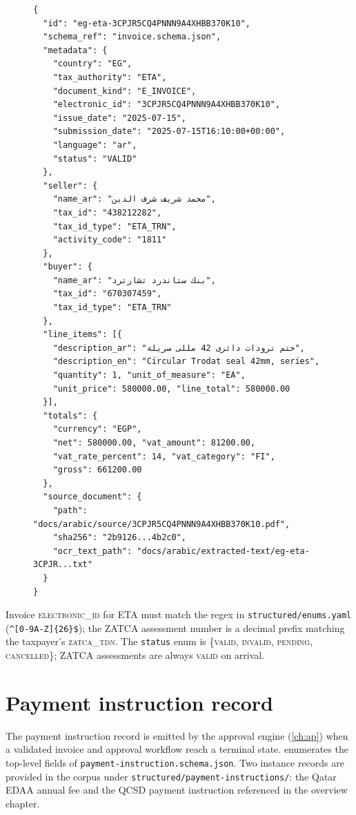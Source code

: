 \documentclass[11pt,a4paper,twoside]{report}
\newcommand{\corpus}{}
\begin{document}
\begin{figure}[htbp]
\begin{lstlisting}[language=jsonx,caption={Full invoice record for the
Egypt ETA seal invoice (\texttt{eg-eta-3CPJR5CQ4PNNN9A4XHBB370K10}).
Arabic strings are UTF-8; the LaTeX engine renders them RTL.},
label=lst:invoice-example]
{
  "id": "eg-eta-3CPJR5CQ4PNNN9A4XHBB370K10",
  "schema_ref": "invoice.schema.json",
  "metadata": {
    "country": "EG",
    "tax_authority": "ETA",
    "document_kind": "E_INVOICE",
    "electronic_id": "3CPJR5CQ4PNNN9A4XHBB370K10",
    "issue_date": "2025-07-15",
    "submission_date": "2025-07-15T16:10:00+00:00",
    "language": "ar",
    "status": "VALID"
  },
  "seller": {
    "name_ar": "محمد شريف شرف الدين",
    "tax_id": "438212282",
    "tax_id_type": "ETA_TRN",
    "activity_code": "1811"
  },
  "buyer": {
    "name_ar": "بنك ستاندرد تشارترد",
    "tax_id": "670307459",
    "tax_id_type": "ETA_TRN"
  },
  "line_items": [{
    "description_ar": "ختم ترودات دائرى 42 مللى سريلة",
    "description_en": "Circular Trodat seal 42mm, series",
    "quantity": 1, "unit_of_measure": "EA",
    "unit_price": 580000.00, "line_total": 580000.00
  }],
  "totals": {
    "currency": "EGP",
    "net": 580000.00, "vat_amount": 81200.00,
    "vat_rate_percent": 14, "vat_category": "FI",
    "gross": 661200.00
  },
  "source_document": {
    "path": "docs/arabic/source/3CPJR5CQ4PNNN9A4XHBB370K10.pdf",
    "sha256": "2b9126...4b2c0",
    "ocr_text_path": "docs/arabic/extracted-text/eg-eta-3CPJR...txt"
  }
}
\end{lstlisting}
\end{figure}

Invoice \textsc{electronic\_id} for ETA must match the regex in
\corpus\texttt{structured/enums.yaml}
(\verb|^[0-9A-Z]{26}$|); the ZATCA assessment number is a decimal prefix
matching the taxpayer's \textsc{zatca\_tdn}. The \texttt{status} enum is
\{\textsc{valid}, \textsc{invalid}, \textsc{pending}, \textsc{cancelled}\};
ZATCA assessments are always \textsc{valid} on arrival.

\section{Payment instruction record}
\label{sec:payment-instruction-schema}

The payment instruction record is emitted by the approval engine
(\cref{ch:ap}) when a validated invoice and approval workflow reach a
terminal state.  enumerates the
top-level fields of \texttt{payment-instruction.schema.json}. Two
instance records are provided in the corpus under
\texttt{structured/payment-instructions/}: the Qatar EDAA annual fee
and the QCSD payment instruction referenced in the overview chapter.
\end{document}
